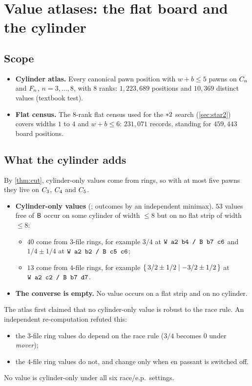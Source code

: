 \section{Value atlases: the flat board and the cylinder}\label{sec:atlas}

\subsection{Scope}
\begin{itemize}
\item \textbf{Cylinder atlas.} Every canonical pawn position with $w+b\le5$ pawns on $C_{n}$ and $F_{n}$,
  $n=3,\dots,8$, with $8$ ranks: $1{,}223{,}689$ positions and $10{,}369$ distinct values (textbook test).
\item \textbf{Flat census.} The $8$-rank flat census used for the $\mathord{\ast 2}$ search (\cref{sec:star2}) covers
  widths $1$ to $4$ and $w+b\le6$: $231{,}071$ records, standing for $459{,}443$ board positions.
\end{itemize}

\subsection{What the cylinder adds}
By \cref{thm:cut}, cylinder-only values come from rings, so with at most five pawns they live on
$C_{3}$, $C_{4}$ and $C_{5}$.
\begin{itemize}
\item \textbf{Cylinder-only values} (; outcomes  by an independent minimax).
  $53$ values free of $\mathsf{B}$ occur on some cylinder of width $\le8$ but on no flat strip of width $\le8$:
  \begin{itemize}
  \item $40$ come from $3$-file rings, for example $3/4$ at $\texttt{W a2 b4 / B b7 c6}$ and $1/4\pm1/4$ at
    $\texttt{W a2 b2 / B c5 c6}$;
  \item $13$ come from $4$-file rings, for example $\{\,3/2\pm1/2 \mid -3/2\pm1/2\,\}$ at $\texttt{W a2 c2 / B b7 d7}$.
  \end{itemize}
\item \textbf{The converse is empty.} No value occurs on a flat strip and on no cylinder.
\end{itemize}
\begin{remark}
The atlas first claimed that no cylinder-only value is robust to the race rule. An independent re-computation
refuted this:
\begin{itemize}
\item the $3$-file ring values do depend on the race rule ($3/4$ becomes $0$ under \emph{mover});
\item the $4$-file ring values do not, and change only when en passant is switched off.
\end{itemize}
No value is cylinder-only under all six race/e.p.\ settings.
\end{remark}

